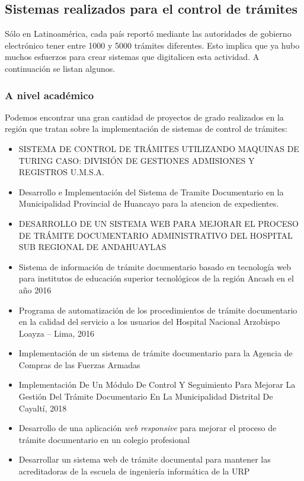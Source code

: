 \subsection{Sistemas realizados para el control de trámites}

Sólo en Latinoamérica, cada país reportó mediante las autoridades de gobierno electrónico tener entre 1000 y 5000 trámites diferentes. Esto implica que ya hubo muchos esfuerzos para crear sistemas que digitalicen esta actividad. A continuación se listan algunos.

\subsubsection{A nivel académico}

Podemos encontrar una gran cantidad de proyectos de grado realizados en la región que tratan sobre la implementación de sistemas de control de trámites:

\begin{itemize}
    \item SISTEMA DE CONTROL DE TRÁMITES UTILIZANDO MAQUINAS DE TURING CASO: DIVISIÓN DE GESTIONES ADMISIONES Y REGISTROS U.M.S.A.
    \item Desarrollo e Implementación del Sistema de Tramite
          Documentario en la Municipalidad Provincial de
          Huancayo para la atencion de expedientes.
    \item DESARROLLO DE UN SISTEMA WEB PARA MEJORAR  EL PROCESO DE TRÁMITE DOCUMENTARIO ADMINISTRATIVO DEL HOSPITAL SUB REGIONAL DE  ANDAHUAYLAS
    \item Sistema de información de trámite documentario basado en tecnología web para institutos de educación superior tecnológicos de la región Ancash en el año 2016
    \item Programa de automatización de los procedimientos de trámite documentario en la calidad del servicio a los usuarios del Hospital Nacional Arzobispo Loayza – Lima, 2016
    \item Implementación de un sistema de trámite documentario para la Agencia de Compras de las Fuerzas Armadas
    \item Implementación De Un Módulo De Control Y Seguimiento Para Mejorar La Gestión Del Trámite Documentario En La Municipalidad Distrital De Cayaltí, 2018
    \item Desarrollo de una aplicación \textit{web responsive} para mejorar el proceso de trámite documentario en un colegio profesional
    \item Desarrollar un sistema web de trámite documental para mantener las acreditadoras de la escuela de ingeniería informática de la URP
\end{itemize}

